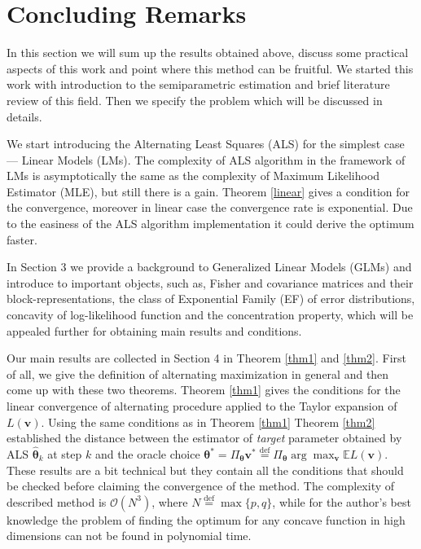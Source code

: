 \section{Concluding Remarks}
\par In this section we will sum up the results obtained above, discuss some practical aspects of this work and point where this method can be fruitful. We started this work with introduction to the semiparametric estimation and brief literature review of this field. Then we specify the problem which will be discussed in details.  
\par We start introducing the Alternating Least Squares (ALS) for the simplest case --- Linear Models (LMs). The complexity of ALS algorithm in the framework of LMs is asymptotically the same as the complexity of Maximum Likelihood Estimator (MLE), but still there is a gain. Theorem \eqref{linear} gives a condition for the convergence, moreover in linear case the convergence rate is exponential. Due to the easiness of the ALS algorithm implementation it could derive the optimum faster.
\par In Section 3 we provide a background to Generalized Linear Models (GLMs) and introduce  to important objects, such as, Fisher and covariance matrices and their block-representations, the class of Exponential Family (EF) of error distributions, concavity of log-likelihood function and the concentration property, which will be appealed further for obtaining main results and conditions.
\par Our main results are collected in Section 4 in Theorem \eqref{thm1} and \eqref{thm2}. First of all, we give the definition of alternating maximization in general and then come up with these two theorems. Theorem \eqref{thm1} gives the conditions for the linear convergence of alternating procedure applied to the Taylor expansion of $L(\bm{v})$. Using the same conditions as in Theorem \eqref{thm1} Theorem \eqref{thm2} established the distance between the estimator of {\it{target}} parameter obtained by ALS $\hat{\bm{\theta}}_k$ at step $k$ and the oracle choice $\bm{\theta}^* = \Pi_{\bm{\theta}} {\bm{v}}^* \stackrel{\mathrm{def}}{=} \Pi_{\bm{\theta}}\arg\max_{\bm{v}}\mathbb{E}L(\bm{v})$. These results are a bit technical but they contain all the conditions that should be checked before claiming the convergence of the method. The complexity of described method is $\mathcal{O}(N^3)$, where $N \stackrel{\mathrm{def}}{=} \max\{p, q\}$, while for the author's best knowledge the problem of  finding the optimum for any concave function in high dimensions can not be found in polynomial time.

